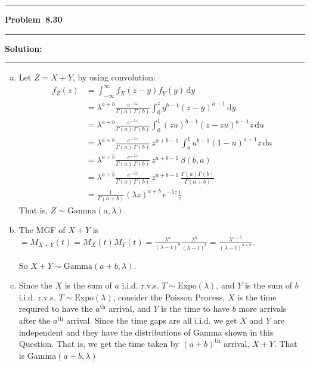 \documentclass[10.5pt]{article}
\newcommand\question[1]{\vspace{.2in}\hrule\vspace{0.04in}\textbf{Problem\ #1}\vspace{.4em}\hrule\vspace{.10in}}
\newcommand\Solution{\vspace{.3in}\textbf{Solution:}\vspace{.5em}\hrule\vspace{.08in}\par}
\begin{document}
\pagebreak

\question{8.30}
\Solution{}
\begin{enumerate}[(a)]
	\item Let $Z = X+Y$, by using convolution:
	\begin{align*}
		f_{Z}(z) &= \int_{-\infty}^{\infty}f_X(z-y)f_Y(y)\,\mathrm{d}y 
		\\[8pt]
		&= \lambda^{a+b}\frac{e^{-\lambda z}}{\Gamma(a)\,\Gamma(b)}\int_{0}^{z}y^{b-1}(z-y)^{a-1}\,\mathrm{d}y\\[8pt]&= \lambda^{a+b}\frac{e^{-\lambda z}}{\Gamma(a)\,\Gamma(b)}\int_{0}^{1}(zu)^{b-1}(z-zu)^{a-1}z\,\mathrm{d}u\\[8pt]
		&= \lambda^{a+b}\frac{e^{-\lambda z}}{\Gamma(a)\,\Gamma(b)}\, z^{a+b-1}\,\int_{0}^{1}u^{b-1}(1-u)^{a-1}z\,\mathrm{d}u \\[8pt]&= \lambda^{a+b}\frac{e^{-\lambda z}}{\Gamma(a)\,\Gamma(b)}\, z^{a+b-1}\, \beta(b, a)\\[8pt]
		&= \lambda^{a+b}\frac{e^{-\lambda z}}{\Gamma(a)\,\Gamma(b)}\, z^{a+b-1}\, \frac{\Gamma(a)\Gamma(b)}{\Gamma(a+b)} \\[8pt]
		&= \frac{1}{\Gamma(a+b)}(\lambda z)^{a+b}\, e^{-\lambda z}\frac{1}{z}
	\end{align*}
	That is, $Z\sim\text{Gamma}(a, \lambda)$.\vspace{1cm}
	\item The MGF of $X+Y$ is $=M_{X+Y}(t)=M_X(t)M_Y(t) = \frac{\lambda^a}{(\lambda-t)^a}\frac{\lambda^b}{(\lambda - t)^b} =\frac{\lambda^{a+b}}{(\lambda - t)^{a+b}}$.
	
	So $X+Y\sim\text{Gamma}(a+b, \lambda)$.\vspace{1cm}
	\item Since the $X$ is the sum of $a$ i.i.d. r.v.s. $T\sim\text{Expo}(\lambda)$, and $Y$ is the sum of $b$ i.i.d. r.v.s. $T\sim\text{Expo}(\lambda)$, consider the Poisson Process, $X$ is the time required to have the $a^{\text{th}}$ arrival, and $Y$ is the time to have $b$ more arrivals after the $a^{\text{th}}$ arrival. Since the time gaps are all i.i.d. we get $X$ and $Y$ are independent and they have the distributions of Gamma shown in this Question. That is, we get the time taken by $(a+b)^{\text{th}}$ arrival, $X+Y$. That is Gamma$(a+b, \lambda)$
\end{enumerate}

\pagebreak
\end{document}
